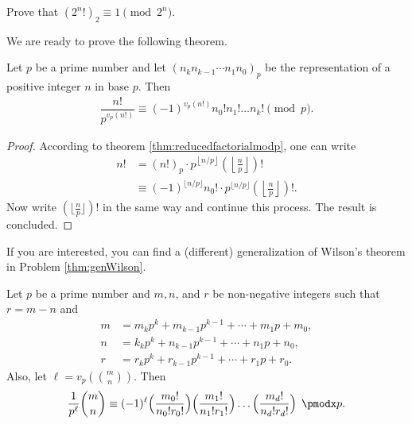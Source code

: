 \documentclass{subfile}
\begin{document}
	\begin{problem}
		Prove that $(2^n!)_2 \equiv 1 \pmod{2^n}$.
	\end{problem}
	
We are ready to prove the following theorem.

	\begin{theorem}\label{thm:wilsongeneral}
		Let $p$ be a prime number and let $(n_k n_{k-1}\cdots n_1 n_0)_p$ be the representation of a positive integer $n$ in base $p$. Then
			\begin{align}\label{eq:wilsongeneral}
				\dfrac{n!}{p^{v_p(n!)}}\equiv (-1)^{v_p(n!)} n_0!n_1!\dots n_k!\pmod p.
			\end{align}
	\end{theorem}
	
	\begin{proof}
		According to theorem \eqref{thm:reducedfactorialmodp}, one can write
			\begin{align*}
				n! &= (n!)_p \cdot p^{\left\lfloor n/p\right\rfloor}\left(\left\lfloor\frac{n}{p}\right\rfloor\right)!\\
				&\equiv (-1)^{\lfloor n/p\rfloor} n_0! \cdot p^{\lfloor n/p \rfloor}\left(\left\lfloor\frac{n}{p}\right\rfloor\right)!.
			\end{align*}
		Now write $(\lfloor \frac np\rfloor)!$ in the same way and continue this process. The result is concluded.
	\end{proof}
	
	\begin{note}
		If you are interested, you can find a (different) generalization of Wilson's theorem in Problem \ref{thm:genWilson}.
	\end{note}
	\begin{theorem}
		Let $p$ be a prime number and $m, n$, and $r$ be non-negative integers such that $r=m-n$ and
			\begin{align*}
				m&=m_kp^k+m_{k-1}p^{k-1}+\cdots +m_1p+m_0,\\
				n&=k_kp^k+n_{k-1}p^{k-1}+\cdots +n_1p+n_0,\\
				r&=r_kp^k+r_{k-1}p^{k-1}+\cdots +r_1p+r_0.
			\end{align*}
		Also, let $\ell = v_p\left(\binom{m}{n}\right)$. Then
			\begin{align*}
				\frac1{p^\ell}\binom{m}{n}\equiv (-1)^\ell
				\Bigl(\frac{m_0!}{n_0!r_0!}\Bigr) \Bigl(\frac{m_1!}{n_1!r_1!}\Bigr) \dots \Bigl(\frac{m_d!}{n_d!r_d!}\Bigr) \pmod p.
			\end{align*}
	\end{theorem}
	
\end{document}
